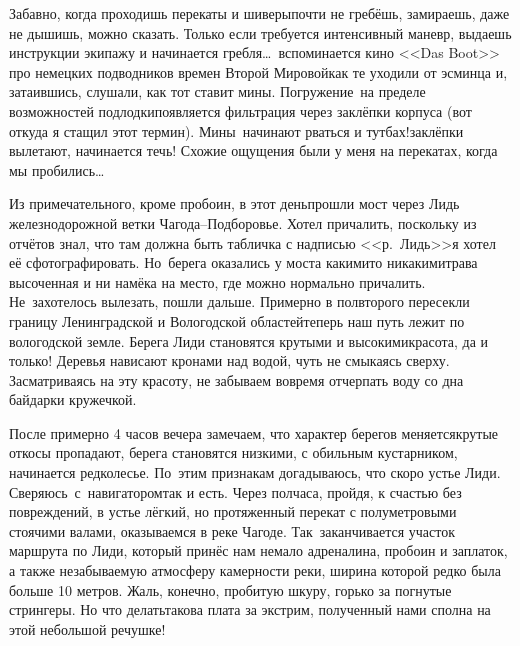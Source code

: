 Забавно, когда проходишь перекаты и шиверы\mdash почти не гребёшь, замираешь, даже не дышишь, можно сказать. Только если требуется интенсивный маневр, выдаешь инструкции экипажу и начинается гребля\ldots~вспоминается кино <<Das Boot>> про немецких подводников времен Второй Мировой\mdash как те уходили от эсминца и, затаившись, слушали, как тот ставит мины. Погружение~на пределе возможностей подлодки\mdash появляется фильтрация через заклёпки корпуса (вот откуда я стащил этот термин). Мины~начинают рваться и тут\mdash бах!\mdash заклёпки вылетают, начинается течь! Схожие ощущения были у меня на перекатах, когда мы пробились\ldots~

Из примечательного, кроме пробоин, в этот день\mdash прошли мост через Лидь железнодорожной ветки Чагода\nobreakdash--Подборовье. Хотел причалить, поскольку из отчётов знал, что там должна быть табличка с надписью <<р.~Лидь>>\mdash я хотел её сфотографировать. Но~берега оказались у моста какими\sdash то никакими\mdash трава высоченная и ни намёка на место, где можно нормально причалить. Не~захотелось вылезать, пошли дальше. Примерно в полвторого пересекли границу Ленинградской и Вологодской областей\mdash теперь наш путь лежит по вологодской земле. Берега Лиди становятся крутыми и высокими\mdash красота, да и только! Деревья нависают кронами над водой, чуть не смыкаясь сверху. Засматриваясь на эту красоту, не забываем вовремя отчерпать воду со дна байдарки кружечкой.

После примерно 4 часов вечера замечаем, что характер берегов меняется\mdash крутые откосы пропадают, берега становятся низкими, с обильным кустарником, начинается редколесье. По~этим признакам догадываюсь, что скоро устье Лиди. Сверяюсь~с~навигатором\mdash так и есть. Через полчаса, пройдя, к счастью без повреждений, в устье лёгкий, но протяженный перекат с полуметровыми стоячими валами, оказываемся в реке Чагоде. Так~заканчивается участок маршрута по Лиди, который принёс нам немало адреналина, пробоин и заплаток, а также незабываемую атмосферу камерности реки, ширина которой редко была больше 10 метров. Жаль, конечно, пробитую шкуру, горько за погнутые стрингеры. Но что делать\mdash такова плата за экстрим, полученный нами сполна на этой небольшой речушке! 

